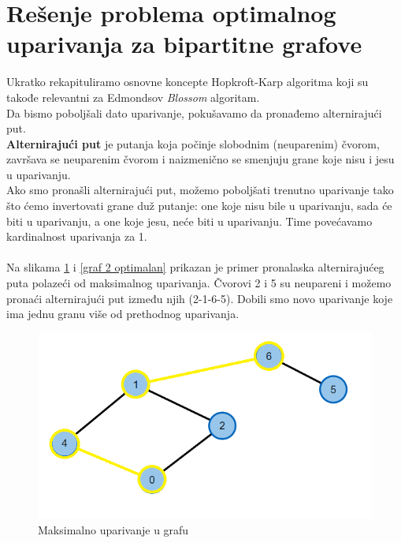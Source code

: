 \documentclass[11pt,a4paper]{article}
\theoremstyle{definition}
\begin{document}
\section{Rešenje problema optimalnog uparivanja za bipartitne grafove}	
Ukratko rekapituliramo osnovne koncepte Hopkroft-Karp algoritma koji su takođe relevantni za Edmondsov \textit{Blossom} algoritam.\\ Da bismo poboljšali dato uparivanje, pokušavamo da pronađemo alternirajući put.\\ \textbf{ Alternirajući put} je putanja koja počinje slobodnim (neuparenim) čvorom, završava se neuparenim čvorom i naizmenično se smenjuju grane koje nisu i jesu u uparivanju. \\Ako smo pronašli alternirajući put, možemo poboljšati trenutno uparivanje tako što ćemo invertovati grane duž putanje: one koje nisu bile u uparivanju, sada će biti u uparivanju, a one koje jesu, neće biti u uparivanju. Time povećavamo kardinalnost uparivanja za 1. \\ \\
Na slikama \ref{graf 2 maksimalan} i \ref{graf 2 optimalan} prikazan je primer pronalaska alternirajućeg puta polazeći od maksimalnog uparivanja. Čvorovi 2 i 5 su neupareni i možemo pronaći alternirajući put između njih (2-1-6-5). Dobili smo novo uparivanje koje ima jednu granu više od prethodnog uparivanja.
\begin{figure}[H]
\begin{center}
\includegraphics[scale=0.7]{Graf 2 - maksimalan.png}
\end{center}
\caption{Maksimalno uparivanje u grafu}
\label{graf 2 maksimalan}
\end{figure}
\end{document}
